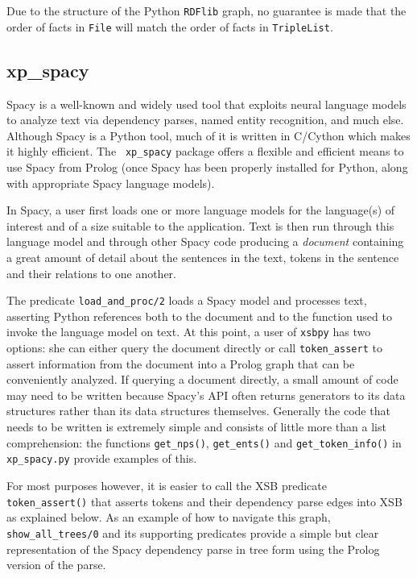 Due to the structure of the Python {\tt RDFlib} graph, no guarantee is
made that the order of facts in {\tt File} will match the order of
facts in {\tt TripleList}.
  
\subsection{xp\_spacy}
Spacy is a well-known and widely used tool that exploits neural
language models to analyze text via dependency parses, named entity
recognition, and much else.  Although Spacy is a Python tool, much of
it is written in C/Cython which makes it highly efficient.  The {\tt
  xp\_spacy} package offers a flexible and efficient means to use
Spacy from Prolog (once Spacy has been properly installed for Python,
along with appropriate Spacy language models).

In Spacy, a user first loads one or more language models for the
language(s) of interest and of a size suitable to the application.
Text is then run through this language model and through other Spacy
code producing a {\em document} containing a great amount of detail
about the sentences in the text, tokens in the sentence and their
relations to one another.

The predicate {\tt load\_and\_proc/2} loads a Spacy model and
processes text, asserting Python references both to the document and
to the function used to invoke the language model on text.  At this
point, a user of {\tt xsbpy} has two options: she can either query the
document directly or call {\tt token\_assert} to assert information
from the document into a Prolog graph that can be conveniently
analyzed.  If querying a document directly, a small amount of code may
need to be written because Spacy's API often returns generators to its
data structures rather than its data structures themselves.  Generally
the code that needs to be written is extremely simple and consists of
little more than a list comprehension: the functions {\tt get\_nps()},
{\tt get\_ents()} and {\tt get\_token\_info()} in {\tt xp\_spacy.py}
provide examples of this.

For most purposes however, it is easier to call the XSB predicate {\tt
  token\_assert()} that asserts tokens and their dependency parse
edges into XSB as explained below.  As an example of how to navigate
this graph, {\tt show\_all\_trees/0} and its supporting predicates
provide a simple but clear representation of the Spacy dependency
parse in tree form using the Prolog version of the parse.

